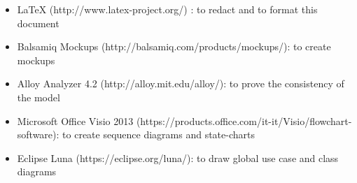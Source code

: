 \begin{itemize}
	\item LaTeX (http://www.latex-project.org/) : to redact and to format this document
	\item Balsamiq Mockups (http://balsamiq.com/products/mockups/): to create
	mockups
	\item Alloy Analyzer 4.2 (http://alloy.mit.edu/alloy/): to prove the consistency of the model
	\item Microsoft Office Visio 2013 (https://products.office.com/it-it/Visio/flowchart-software): to create sequence diagrams and state-charts
	\item Eclipse Luna (https://eclipse.org/luna/): to draw global use case and class diagrams
\end{itemize}